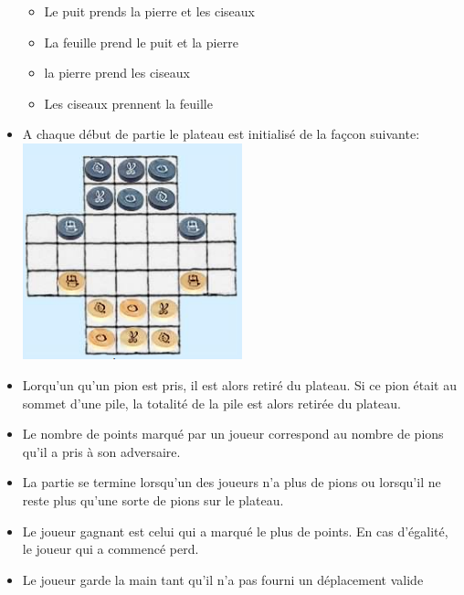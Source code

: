 \documentclass[12pt]{article}
\begin{document}
\begin{itemize}
\begin{itemize}
  \item[\textbullet]Le puit prends la pierre et les ciseaux
  \item[\textbullet]La feuille prend le puit et la pierre
  \item[\textbullet]la pierre prend les ciseaux
  \item[\textbullet]Les ciseaux prennent la feuille
\end{itemize}
\item A chaque début de partie le plateau est initialisé de la façcon suivante:
\includegraphics[width=0.5\textwidth]{images/init.png}
\item Lorqu'un qu'un pion est pris, il est alors retiré du plateau. Si ce pion était au sommet d'une pile, la totalité de la pile est alors retirée du plateau. 
\item Le nombre de points marqué par un joueur correspond au nombre de pions qu'il a pris à son adversaire.
\item La partie se termine lorsqu'un des joueurs n'a plus de pions ou lorsqu'il ne reste plus qu'une sorte de pions sur le plateau.
\item Le joueur gagnant est celui qui a marqué le plus de points. En cas d'égalité, le joueur qui a commencé perd.
\item Le joueur garde la main tant qu'il n'a pas fourni un déplacement valide
\end{itemize}
\end{document}
